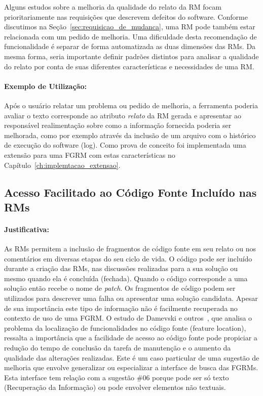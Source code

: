 Alguns estudos sobre a melhoria da qualidade do relato da RM focam
prioritariamente nas requisições que descrevem defeitos do software. Conforme
discutimos na Seção~\ref{sec:requisicao_de_mudanca}, uma RM pode também estar
relacionada com um pedido de melhoria. Uma dificuldade desta recomendação de
funcionalidade é separar de forma automatizada as duas dimensões das RMs. Da
mesma forma, seria importante definir padrões distintos para analisar a
qualidade do relato por conta de suas diferentes características e necessidades
de uma RM\@.

\paragraph{Exemplo de Utilização:}\label{par:exemplo_s01}

Após o usuário relatar um problema ou pedido de melhoria, a ferramenta poderia
avaliar o texto corresponde ao atributo \textit{relato} da RM gerada e
apresentar ao responsável realimentação sobre como a informação fornecida
poderia ser melhorada, como por exemplo através da inclusão de um arquivo com o
histórico de execução do software (log). Como prova de conceito foi
implementada uma extensão para uma FGRM com estas características no
Capítulo~\ref{ch:implemtacao_extensao}.

\subsection{Acesso Facilitado ao Código Fonte Incluído nas RMs}\label{sub:busca_por_código_fonte}


\paragraph{Justificativa:}\label{par:justificativa_s02}

As RMs permitem a inclusão de fragmentos de código fonte em seu relato ou nos
comentários em diversas etapas do seu ciclo de vida. O código pode ser incluído
durante a criação das RMs, nas discussões realizadas para a sua solução ou
mesmo quando ela é concluída (fechada). Quando o código corresponde a uma
solução então recebe o nome de \textit{patch}. Os fragmentos de código podem
ser utilizados para descrever uma falha ou apresentar uma solução candidata.
Apesar de sua importância este tipo de informação não é facilmente recuperada
no contexto de uso de uma FGRM\@. O estudo de Damevski e
outros~\cite{damevski2016field}, que analisa o problema da localização de
funcionalidades no código fonte (feature location), ressalta a importância que
a facilidade de acesso ao código fonte pode propiciar a redução do tempo de
conclusão da tarefa de manutenção e o aumento da qualidade das alterações
realizadas. Este é um caso particular de uma sugestão de melhoria que envolve
generalizar ou especializar a interface de busca das FGRMs. Esta interface tem
relação com a sugestão \#06 porque pode ser só texto (Recuperação da
Informação) ou pode envolver elementos não textuais.

